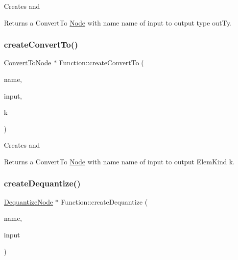 Creates and \begin{DoxyReturn}{Returns}
a Convert\+To \hyperlink{classglow_1_1_node}{Node} with name {\ttfamily name} of {\ttfamily input} to output type {\ttfamily out\+Ty}. 
\end{DoxyReturn}
\mbox{\label{classglow_1_1_function_aad00b9f260eb7c5c21f5c59ebd0089b3}} 
\subsubsection{\texorpdfstring{create\+Convert\+To()}{createConvertTo()}\hspace{0.1cm}{\footnotesize\ttfamily [2/2]}}
{\footnotesize\ttfamily \hyperlink{classglow_1_1_convert_to_node}{Convert\+To\+Node} $\ast$ Function\+::create\+Convert\+To (\begin{DoxyParamCaption}\item[{llvm\+::\+String\+Ref}]{name,  }\item[{\hyperlink{structglow_1_1_node_value}{Node\+Value}}]{input,  }\item[{\hyperlink{namespaceglow_ab92e14a94329daf4083db670e95fbcdf}{Elem\+Kind}}]{k }\end{DoxyParamCaption})}

Creates and \begin{DoxyReturn}{Returns}
a Convert\+To \hyperlink{classglow_1_1_node}{Node} with name {\ttfamily name} of {\ttfamily input} to output Elem\+Kind {\ttfamily k}. 
\end{DoxyReturn}
\mbox{\label{classglow_1_1_function_ac553e6f6d7495c5371f64a9a41080f8d}} 
\subsubsection{\texorpdfstring{create\+Dequantize()}{createDequantize()}\hspace{0.1cm}{\footnotesize\ttfamily [1/2]}}
{\footnotesize\ttfamily \hyperlink{classglow_1_1_dequantize_node}{Dequantize\+Node} $\ast$ Function\+::create\+Dequantize (\begin{DoxyParamCaption}\item[{llvm\+::\+String\+Ref}]{name,  }\item[{\hyperlink{structglow_1_1_node_value}{Node\+Value}}]{input }\end{DoxyParamCaption})}

